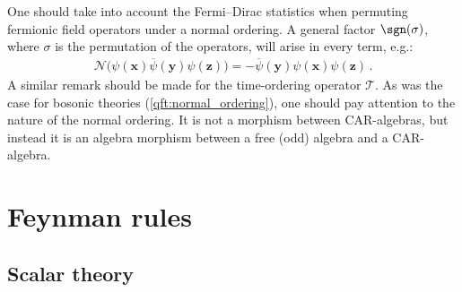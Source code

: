 
    \begin{remark}\label{qft:ordering_morphism}
        One should take into account the Fermi--Dirac statistics when permuting fermionic field operators under a normal ordering. A general factor $\sgn(\sigma)$, where $\sigma$ is the permutation of the operators, will arise in every term, e.g.:
        \begin{gather}
            \mathcal{N}\bigl(\psi(\symbf{x})\overline\psi(\symbf{y})\psi(\symbf{z})\bigr) = -\overline\psi(\symbf{y})\psi(\symbf{x})\psi(\symbf{z})\,.
        \end{gather}
        A similar remark should be made for the time-ordering operator $\mathcal{T}$. As was the case for bosonic theories (\cref{qft:normal_ordering}), one should pay attention to the nature of the normal ordering. It is not a morphism between CAR-algebras, but instead it is an algebra morphism between a free (odd) algebra and a CAR-algebra.
    \end{remark}

\section{Feynman rules}
\subsection{Scalar theory}

